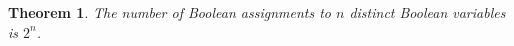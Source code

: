 \documentclass{article}
\newtheorem{theorem}{Theorem}
\begin{document}
\begin{theorem}\label{thm:R08}
The number of Boolean assignments to $n$ distinct Boolean variables is $2^n$.
\end{theorem}
\end{document}

